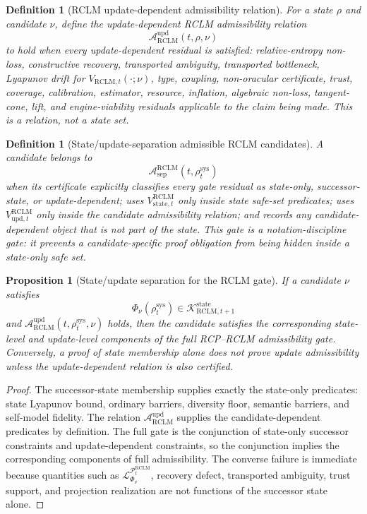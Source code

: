 \documentclass[11pt,a4paper]{article}
\newtheorem{proposition}[theorem]{Proposition}
\newtheorem{definition}[theorem]{Definition}
\newcommand{\Lcal}{\mathcal L}
\newcommand{\Pcal}{\mathcal P}
\newcommand{\Acal}{\mathcal A}
\newcommand{\Kcal}{\mathcal K}
\newcommand{\RCLM}{\mathrm{RCLM}}
\newcommand{\sys}{\mathrm{sys}}
\newcommand{\state}{\mathrm{state}}
\newcommand{\upd}{\mathrm{upd}}
\begin{document}
\begin{definition}[RCLM update-dependent admissibility relation]
\label{def:rclm-update-dependent-admissibility-relation}
For a state \(\rho\) and candidate \(\nu\), define the update-dependent RCLM admissibility relation
\[
\Acal_{\RCLM}^{\upd}(t,\rho,\nu)
\]
to hold when every update-dependent residual is satisfied: relative-entropy non-loss, constructive recovery, transported ambiguity, transported bottleneck, Lyapunov drift for \(V_{\RCLM,t}(\cdot;\nu)\), type, coupling, non-oracular certificate, trust, coverage, calibration, estimator, resource, inflation, algebraic non-loss, tangent-cone, lift, and engine-viability residuals applicable to the claim being made.  This is a relation, not a state set.
\end{definition}

\begin{definition}[State/update-separation admissible RCLM candidates]
\label{def:rclm-state-update-separation-admissible}
A candidate belongs to
\[
\Acal_{\mathrm{sep}}^{\RCLM}(t,\rho_t^{\sys})
\]
when its certificate explicitly classifies every gate residual as state-only, successor-state, or update-dependent; uses \(V_{\mathrm{state},t}^{\RCLM}\) only inside state safe-set predicates; uses \(V_{\mathrm{upd},t}^{\RCLM}\) only inside the candidate admissibility relation; and records any candidate-dependent object that is not part of the state. This gate is a notation-discipline gate: it prevents a candidate-specific proof obligation from being hidden inside a state-only safe set.
\end{definition}

\begin{proposition}[State/update separation for the RCLM gate]
\label{prop:rclm-state-update-separation}
If a candidate \(\nu\) satisfies
\[
\Phi_\nu(\rho_t^{\sys})\in\Kcal_{\RCLM,t+1}^{\state}
\]
and \(\Acal_{\RCLM}^{\upd}(t,\rho_t^{\sys},\nu)\) holds, then the candidate satisfies the corresponding state-level and update-level components of the full RCP--RCLM admissibility gate.  Conversely, a proof of state membership alone does not prove update admissibility unless the update-dependent relation is also certified.
\end{proposition}

\begin{proof}
The successor-state membership supplies exactly the state-only predicates: state Lyapunov bound, ordinary barriers, diversity floor, semantic barriers, and self-model fidelity.  The relation \(\Acal_{\RCLM}^{\upd}\) supplies the candidate-dependent predicates by definition.  The full gate is the conjunction of state-only successor constraints and update-dependent constraints, so the conjunction implies the corresponding components of full admissibility.  The converse failure is immediate because quantities such as \(\Lcal^{\Pcal_t^{\RCLM}}_{\Phi_\nu}\), recovery defect, transported ambiguity, trust support, and projection realization are not functions of the successor state alone.
\end{proof}
\end{document}

